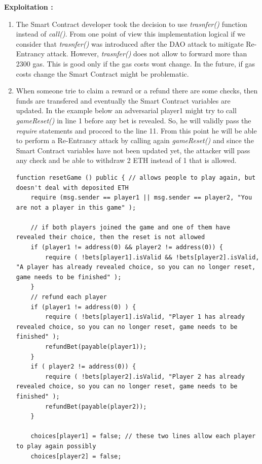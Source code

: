 \documentclass[12pt,a4paper]{article}
\begin{document}
\textbf{Exploitation :} 

\begin{enumerate}
    \item The Smart Contract developer took the decision to use \emph{trasnfer()} function instead
    of \emph{call()}. From one point of view this implementation logical if we consider that \emph{trasnfer()}
    was introduced after the DAO attack to mitigate Re-Entrancy attack. However, \emph{trasnfer()}
    does not allow to forward more than 2300 gas. This is good only if the gas costs wont change. 
    In the future, if gas costs change the Smart Contract might be problematic.
    \item When someone trie to claim a reward or a refund there are some checks, then funds are
    transfered and eventually the Smart Contract variables are updated. In the example below an 
    adversarial player1 might try to call \emph{gameReset()} in line 1 before any bet is revealed.
    So, he will validly pass the \emph{require} statements and procced to the line 11. From this
    point he will be able to perform a Re-Entrancy attack by calling again \emph{gameReset()}
    and since the Smart Contract variables have not been updated yet, the attacker will pass any check
    and be able to withdraw 2 ETH instead of 1 that is allowed. \\
\begin{lstlisting}
function resetGame () public { // allows people to play again, but doesn't deal with deposited ETH
    require (msg.sender == player1 || msg.sender == player2, "You are not a player in this game" );

    // if both players joined the game and one of them have revealed their choice, then the reset is not allowed
    if (player1 != address(0) && player2 != address(0)) {
        require ( !bets[player1].isValid && !bets[player2].isValid, "A player has already revealed choice, so you can no longer reset, game needs to be finished" );
    }
    // refund each player
    if (player1 != address(0) ) {
        require ( !bets[player1].isValid, "Player 1 has already revealed choice, so you can no longer reset, game needs to be finished" );
        refundBet(payable(player1));
    }
    if ( player2 != address(0)) {
        require ( !bets[player2].isValid, "Player 2 has already revealed choice, so you can no longer reset, game needs to be finished" );
        refundBet(payable(player2));
    }

    choices[player1] = false; // these two lines allow each player to play again possibly
    choices[player2] = false;


\end{lstlisting}
\end{enumerate}
\end{document}
